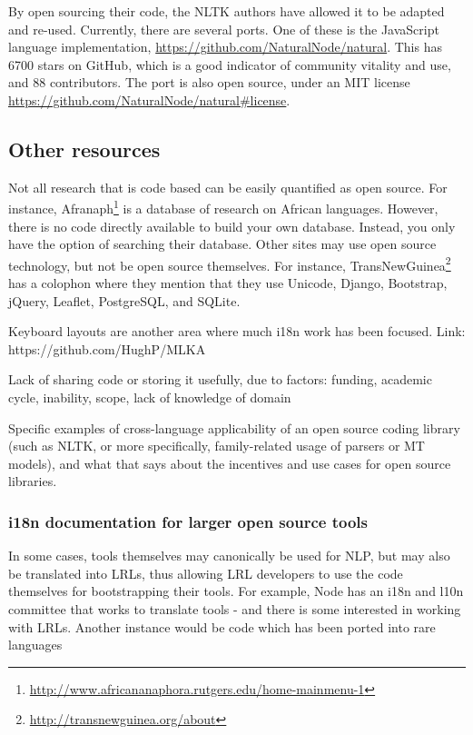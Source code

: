 By open sourcing their code, the NLTK authors have allowed it to be adapted and re-used. Currently, there are several ports. %
One of these is the JavaScript language implementation, \href{https://github.com/NaturalNode/natural}{https://github.com/NaturalNode/natural}. This has 6700 stars on GitHub, which is a good indicator of community vitality and use, and 88 contributors. The port is also open source, under an MIT license \href{https://github.com/NaturalNode/natural\#license}{https://github.com/NaturalNode/natural\#license}.

\subsection{Other resources}

Not all research that is code based can be easily quantified as open source. For instance, Afranaph\footnote{\href{http://www.africananaphora.rutgers.edu/home-mainmenu-1}{http://www.africananaphora.rutgers.edu/home-mainmenu-1}} is a database of research on African languages. However, there is no code directly available to build your own database. Instead, you only have the option of searching their database. Other sites may use open source technology, but not be open source themselves. For instance, TransNewGuinea\footnote{\href{http://transnewguinea.org/about}{http://transnewguinea.org/about}} has a colophon where they mention that they use Unicode, Django, Bootstrap, jQuery, Leaflet, PostgreSQL, and SQLite.

Keyboard layouts are another area where much i18n work has been focused. Link: https://github.com/HughP/MLKA

Lack of sharing code or storing it usefully, due to factors: funding, academic cycle, inability, scope, lack of knowledge of domain

Specific examples of cross-language applicability of an open source coding library (such as NLTK, or more specifically, family-related usage of parsers or MT models), and what that says about the incentives and use cases for open source libraries.

\subsubsection{i18n documentation for larger open source tools}

In some cases, tools themselves may canonically be used for NLP, but may also be translated into LRLs, thus allowing LRL developers to use the code themselves for bootstrapping their tools. For example, Node has an i18n and l10n committee that works to translate tools - and there is some interested in working with LRLs. %
Another instance would be code which has been ported into rare languages %


